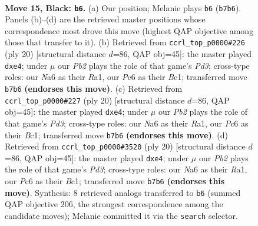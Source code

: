 \documentclass[11pt]{article}
\begin{document}
\begin{figure}[p]
\label{fig:thought-m27}
\end{figure}

\clearpage

\begin{figure}[p]\centering
\begin{subfigure}{0.46\textwidth}\centering
\resizebox{\linewidth}{!}{%
\newchessgame
\chessboard[
  setfen={1rbq1r1k/pp2b2p/n1p3p1/3p1p1n/3P1P2/PQ3NP1/1P1NP1BP/R1B1R2K b - - 4 15},
  showmover=false,
  pgfstyle=straightmove, color=movearrow, markmove={b7-b6}
]}
\caption{}
\end{subfigure}\hfill
\begin{subfigure}{0.46\textwidth}\centering
\resizebox{\linewidth}{!}{%
\newchessgame
\chessboard[
  setfen={rn1qk2r/1p2bpp1/2p1pnbp/p7/4pP2/2NP2P1/PPPN2BP/R1BQ1R1K w kq - 0 11},
  showmover=false,
  pgfstyle=straightmove, color=movearrow, markmove={d3-e4}
]}
\caption{}
\end{subfigure}
\\[4pt]
\begin{subfigure}{0.46\textwidth}\centering
\resizebox{\linewidth}{!}{%
\newchessgame
\chessboard[
  setfen={rn1qk2r/1p2bpp1/2p1pnbp/p7/4pP2/2NP2P1/PPPN2BP/R1BQ1R1K w kq - 0 11},
  showmover=false,
  pgfstyle=straightmove, color=movearrow, markmove={d3-e4}
]}
\caption{}
\end{subfigure}\hfill
\begin{subfigure}{0.46\textwidth}\centering
\resizebox{\linewidth}{!}{%
\newchessgame
\chessboard[
  setfen={rn1qk2r/1p2bpp1/2p1pnbp/p7/4pP2/2NP2P1/PPPN2BP/R1BQ1R1K w kq - 0 11},
  showmover=false,
  pgfstyle=straightmove, color=movearrow, markmove={d3-e4}
]}
\caption{}
\end{subfigure}
\caption{\textbf{Move 15, Black: \texttt{b6}.} (a) Our position; Melanie plays \texttt{b6} (\texttt{b7b6}). Panels (b)--(d) are the retrieved master positions whose correspondence most drove this move (highest QAP objective among those that transfer to it). (b) Retrieved from \texttt{ccrl\_top\_p0000\#226} (ply 20) [structural distance $d$=86, QAP obj=45]: the master played \texttt{dxe4}; under $\mu$ our \emph{Pb2} plays the role of that game's \emph{Pd3}; cross-type roles: our \emph{N}a6 as their \emph{R}a1, our \emph{P}c6 as their \emph{B}c1; transferred move \texttt{b7b6} \textbf{(endorses this move)}. (c) Retrieved from \texttt{ccrl\_top\_p0000\#227} (ply 20) [structural distance $d$=86, QAP obj=45]: the master played \texttt{dxe4}; under $\mu$ our \emph{Pb2} plays the role of that game's \emph{Pd3}; cross-type roles: our \emph{N}a6 as their \emph{R}a1, our \emph{P}c6 as their \emph{B}c1; transferred move \texttt{b7b6} \textbf{(endorses this move)}. (d) Retrieved from \texttt{ccrl\_top\_p0000\#3520} (ply 20) [structural distance $d$=86, QAP obj=45]: the master played \texttt{dxe4}; under $\mu$ our \emph{Pb2} plays the role of that game's \emph{Pd3}; cross-type roles: our \emph{N}a6 as their \emph{R}a1, our \emph{P}c6 as their \emph{B}c1; transferred move \texttt{b7b6} \textbf{(endorses this move)}. Synthesis: 8 retrieved analogs transferred to \texttt{b6} (summed QAP objective 206, the strongest correspondence among the candidate moves); Melanie committed it via the \texttt{search} selector.}

\end{figure}
\end{document}
